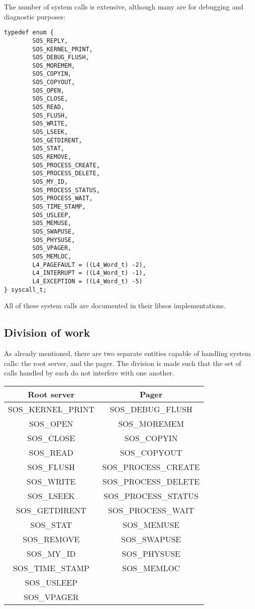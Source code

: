 \documentclass[12pt,english]{article}
\begin{document}
The number of system calls is extensive, although many are for debugging and diagnostic purposes:

\begin{verbatim}
typedef enum {
        SOS_REPLY,
        SOS_KERNEL_PRINT,
        SOS_DEBUG_FLUSH,
        SOS_MOREMEM,
        SOS_COPYIN,
        SOS_COPYOUT,
        SOS_OPEN,
        SOS_CLOSE,
        SOS_READ,
        SOS_FLUSH,
        SOS_WRITE,
        SOS_LSEEK,
        SOS_GETDIRENT,
        SOS_STAT,
        SOS_REMOVE,
        SOS_PROCESS_CREATE,
        SOS_PROCESS_DELETE,
        SOS_MY_ID,
        SOS_PROCESS_STATUS,
        SOS_PROCESS_WAIT,
        SOS_TIME_STAMP,
        SOS_USLEEP,
        SOS_MEMUSE,
        SOS_SWAPUSE,
        SOS_PHYSUSE,
        SOS_VPAGER,
        SOS_MEMLOC,
        L4_PAGEFAULT = ((L4_Word_t) -2),
        L4_INTERRUPT = ((L4_Word_t) -1),
        L4_EXCEPTION = ((L4_Word_t) -5)
} syscall_t;
\end{verbatim}

All of these system calls are documented in their libsos implementations.

\subsection{Division of work}

As already mentioned, there are two separate entities capable of handling system calls: the root server, and the pager.  The division is made such that the set of calls handled by each do not interfere with one another.

\begin{center}
\begin{tabular}{c|c}
Root server & Pager \\ \hline
SOS\_KERNEL\_PRINT & SOS\_DEBUG\_FLUSH \\
SOS\_OPEN & SOS\_MOREMEM \\
SOS\_CLOSE & SOS\_COPYIN \\
SOS\_READ & SOS\_COPYOUT \\
SOS\_FLUSH & SOS\_PROCESS\_CREATE \\
SOS\_WRITE & SOS\_PROCESS\_DELETE \\
SOS\_LSEEK & SOS\_PROCESS\_STATUS \\
SOS\_GETDIRENT & SOS\_PROCESS\_WAIT \\
SOS\_STAT & SOS\_MEMUSE \\
SOS\_REMOVE & SOS\_SWAPUSE \\
SOS\_MY\_ID & SOS\_PHYSUSE \\
SOS\_TIME\_STAMP & SOS\_MEMLOC \\
SOS\_USLEEP & \\
SOS\_VPAGER & \\
\end{tabular}
\end{center}
\end{document}
